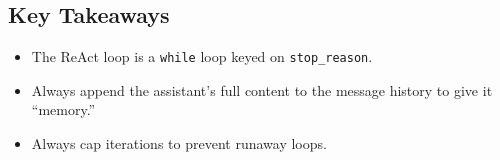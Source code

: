 \subsection*{Key Takeaways}
\begin{itemize}
    \item The ReAct loop is a \texttt{while} loop keyed on \texttt{stop\_reason}.
    \item Always append the assistant's full content to the message history to give it ``memory.''
    \item Always cap iterations to prevent runaway loops.
\end{itemize}
